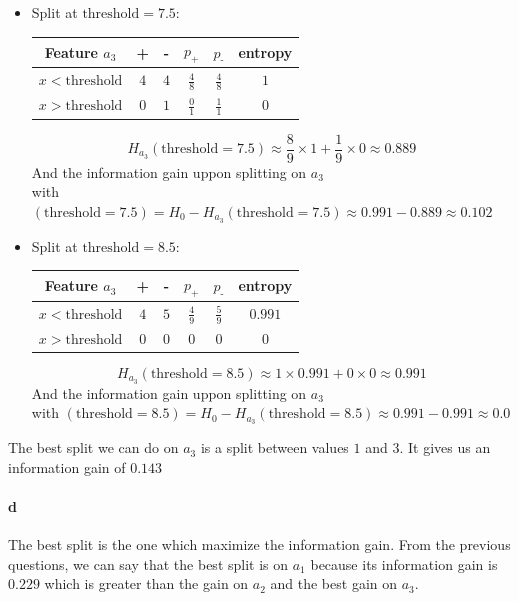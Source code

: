 \documentclass[a4paper, 10pt]{article}
\begin{document}
\begin{itemize}[label=$\square$]
    \item Split at $\text{threshold}=7.5$:
    \begin{center}
        \begin{tabular}{ |c|c|c|c|c|c| }
            \hline
            Feature $a_3$           & +      & -     & $p_\text{+}$ & $p_\text{-}$  & entropy\\
            \hline
            $x<\text{threshold}$    & $4$    & $4$   & $\frac{4}{8}$ & $\frac{4}{8}$    & $1$\\
            \hline
            $x>\text{threshold}$    & $0$    & $1$   & $\frac{0}{1}$ & $\frac{1}{1} $   & $0$\\
            \hline
        \end{tabular}
    \end{center}
    $$
    H_{a_3}(\text{threshold}=7.5) \approx \frac{8}{9}\times1 + \frac{1}{9}\times0 \approx 0.889
    $$
    And the information gain uppon splitting on $a_3$ \\with $(\text{threshold}=7.5)= H_0 -H_{a_3}(\text{threshold}=7.5) \approx 0.991 - 0.889 \approx 0.102$

    \item Split at $\text{threshold}=8.5$:
    \begin{center}
        \begin{tabular}{ |c|c|c|c|c|c| }
            \hline
            Feature $a_3$           & +      & -     & $p_\text{+}$ & $p_\text{-}$  & entropy\\
            \hline
            $x<\text{threshold}$    & $4$    & $5$   & $\frac{4}{9}$ & $\frac{5}{9}$    & $0.991$\\
            \hline
            $x>\text{threshold}$    & $0$    & $0$   & $0$ & $0$   & $0$\\
            \hline
        \end{tabular}
    \end{center}
    $$
    H_{a_3}(\text{threshold}=8.5) \approx 1\times0.991 + 0\times0 \approx 0.991
    $$
    And the information gain uppon splitting on $a_3$ \\with $(\text{threshold}=8.5)= H_0 -H_{a_3}(\text{threshold}=8.5) \approx 0.991 - 0.991 \approx 0.0$
\end{itemize}
The best split we can do on $a_3$ is a split between values $1$ and $3$. It gives us an information gain of
$0.143$
\paragraph{d}
The best split is the one which maximize the information gain. From the previous questions, we can say 
that the best split is on $a_1$ because its information gain is $0.229$ which is greater than the gain on $a_2$
and the best gain on $a_3$.
\end{document}
